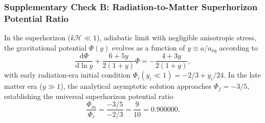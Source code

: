 \subsubsection{Supplementary Check B: Radiation-to-Matter Superhorizon Potential Ratio}

In the superhorizon ($k\mathcal{H} \ll 1$), adiabatic limit with negligible anisotropic stress, the gravitational potential $\Phi(y)$ evolves as a function of $y \equiv a / a_{\mathrm{eq}}$ according to
    \begin{equation}
        \frac{\mathrm{d}\Phi}{\mathrm{d}\ln y} + \frac{6 + 5y}{2(1 + y)}\Phi = -\frac{4 + 3y}{2(1 + y)},
        \label{eq:superhorizon_potential_ode}
    \end{equation}
with early radiation-era initial condition $\Phi_i(y_i \ll 1) = -2/3 + y_i/24$. In the late matter era ($y \gg 1$), the analytical asymptotic solution approaches $\Phi_f=  -3/5$, establishing the universal superhorizon potential ratio
    \begin{equation}
        \frac{\Phi_m}{\Phi_r} = \frac{-3/5}{-2/3} = \frac{9}{10} = 0.900000.
        \label{eq:potential_ratio_theoretical}
    \end{equation}

